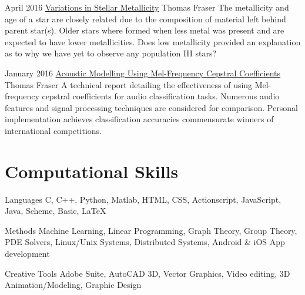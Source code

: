 \documentclass{article}
\begin{document}
        {
            \begin{paperlist}
                \item{April 2016}
                {\href{https://github.com/tcfraser/tcfraser.github.io/raw/master/documents/stellar_metallicity.pdf}{Variations in Stellar Metallicity}}
                {Thomas Fraser}
                {The metallicity and age of a star are closely related due to the composition of material left behind parent star(s). Older stars where formed when less metal was present and are expected to have lower metallicities. Does low metallicity provided an explanation as to why we have yet to observe any population III stars?}
                \item{January 2016}
                {\href{https://github.com/tcfraser/tcfraser.github.io/raw/master/documents/MFCC.pdf}{Acoustic Modelling Using Mel-Frequency Cepstral Coefficients}}
                {Thomas Fraser}
                {A technical report detailing the effectiveness of using Mel-frequency cepstral coefficients for audio classification tasks. Numerous audio features and signal processing techniques are considered for comparison. Personal implementation achieves classification accuracies commensurate winners of international competitions.}
            \end{paperlist}
        }

    \section{Computational Skills}
    \begin{computerlist}
        \item{Languages}
             {C, C++, Python, Matlab, HTML, CSS, Actionscript, JavaScript, Java, Scheme, Basic, LaTeX}
        \item{Methods}
             {Machine Learning, Linear Programming, Graph Theory, Group Theory, PDE Solvers, Linux/Unix Systems, Distributed Systems, Android \& iOS App development}
        \item{Creative Tools}
             {Adobe Suite, AutoCAD 3D, Vector Graphics, Video editing, 3D Animation/Modeling, Graphic Design}
    \end{computerlist}
    \clearpage
\end{document}
